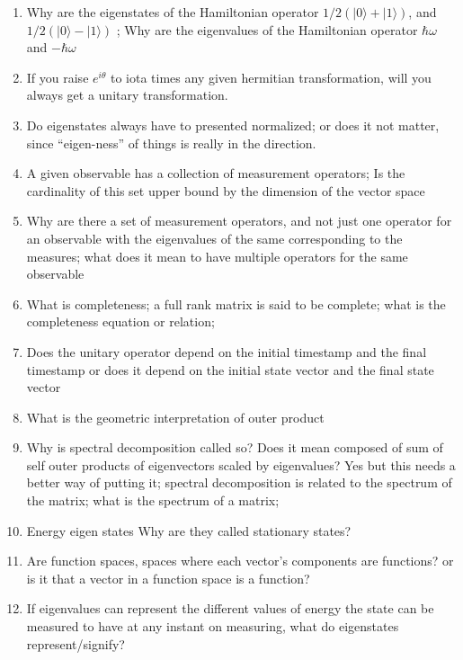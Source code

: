 \documentclass{article}
\begin{document}
\begin{enumerate}
\begin{enumerate}
	\item Why are the eigenstates of the Hamiltonian operator $1/2 (|0\rangle + |1\rangle)$, and  $1/2 (|0\rangle - |1\rangle)$ ; Why are the eigenvalues of the Hamiltonian operator $\hbar \omega$ and $-\hbar \omega$ 

	\item If you raise $e^{i\theta}$ to iota times any given hermitian transformation, will you always get a unitary transformation.

	\item Do eigenstates always have to presented normalized; or does it not matter, since “eigen-ness” of things is really in the direction.

	\item A given observable has a collection of measurement operators; Is the cardinality of this set upper bound by the dimension of the vector space

	\item Why are there a set of measurement operators, and not just one operator for an observable with the eigenvalues of the same corresponding to the measures; what does it mean to have multiple operators for the same observable

	\item What is completeness; a full rank matrix is said to be complete; what is the completeness equation or relation;

	\item Does the unitary operator depend on the initial timestamp and the final timestamp or does it depend on the initial state vector and the final state vector

	\item What is the geometric interpretation of outer product

	\item Why is spectral decomposition called so? Does it mean composed of sum of self outer products of eigenvectors scaled by eigenvalues? Yes but this needs a better way of putting it; spectral decomposition is related to the spectrum of the matrix; what is the spectrum of a matrix;

	\item Energy eigen states Why are they called stationary states?

	\item Are function spaces, spaces where each vector's components are functions? or is it that a vector in a function space is a function?

	\item If eigenvalues can represent the different values of energy the state can be measured to have at any instant on measuring, what do eigenstates represent/signify?


\end{enumerate}
\end{enumerate}
\end{document}
